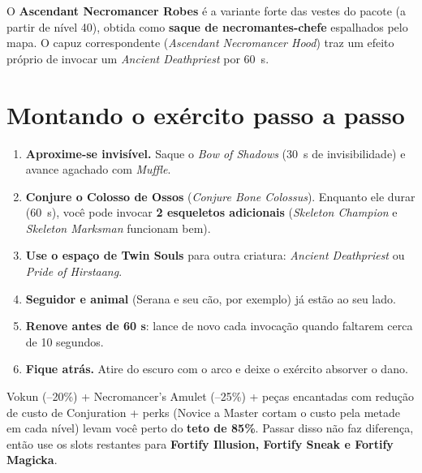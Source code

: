 \documentclass[11pt,a4paper,oneside,openany]{book}
\newcommand{\magia}[1]{\textit{\textcolor{SoulCairnPurple}{#1}}}
\newcommand{\objeto}[1]{\textit{\textcolor{NecroEmerald}{#1}}}
\begin{document}
O \textbf{Ascendant Necromancer Robes} é a variante forte das vestes do pacote (a partir de nível 40), obtida como \textbf{saque de necromantes-chefe} espalhados pelo mapa. O capuz correspondente (\objeto{Ascendant Necromancer Hood}) traz um efeito próprio de invocar um \emph{Ancient Deathpriest} por 60~s.

\section{Montando o exército passo a passo}
\begin{enumerate}
  \item \textbf{Aproxime-se invisível.} Saque o \objeto{Bow of Shadows} (30~s de invisibilidade) e avance agachado com \magia{Muffle}.
  \item \textbf{Conjure o Colosso de Ossos} (\magia{Conjure Bone Colossus}). Enquanto ele durar (60~s), você pode invocar \textbf{2 esqueletos adicionais} (\magia{Skeleton Champion} e \magia{Skeleton Marksman} funcionam bem).
  \item \textbf{Use o espaço de Twin Souls} para outra criatura: \magia{Ancient Deathpriest} ou \magia{Pride of Hirstaang}.
  \item \textbf{Seguidor e animal} (Serana e seu cão, por exemplo) já estão ao seu lado.
  \item \textbf{Renove antes de 60 s}: lance de novo cada invocação quando faltarem cerca de 10 segundos.
  \item \textbf{Fique atrás.} Atire do escuro com o arco e deixe o exército absorver o dano.
\end{enumerate}

\begin{exploit}
Vokun (--20\%) + Necromancer's Amulet (--25\%) + peças encantadas com redução de custo de Conjuration + perks (Novice a Master cortam o custo pela metade em cada nível) levam você perto do \textbf{teto de 85\%}. Passar disso não faz diferença, então use os slots restantes para \textbf{Fortify Illusion, Fortify Sneak e Fortify Magicka}.
\end{exploit}

\Needspace{10cm}
\end{document}
